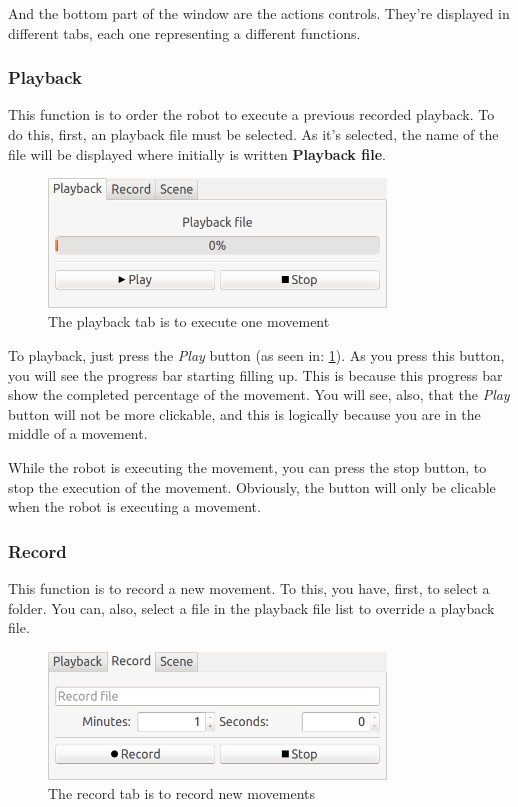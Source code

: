 \documentclass[oneside,a4paper,titlepage]{article}
\begin{document}
And the bottom part of the window are the actions controls. They're displayed in different tabs, each one representing a different functions.

\subsubsection{Playback}
\label{subsec:playback}
	This function is to order the robot to execute a previous recorded playback. To do this, first, an playback file must be selected. As it's selected, the name of the file will be displayed where initially is written \textbf{Playback file}.
	
	\begin{figure}[ht!]
		\centering
		\includegraphics[width=0.8\textwidth]{playback_tab}
		\caption[Playback Tab]{The playback tab is to execute one movement}
		\label{fig:playback_tab}
	\end{figure}
	
	To playback, just press the \emph{Play} button (as seen in: \ref{fig:playback_tab}). As you press this button, you will see the progress bar starting filling up. This is because this progress bar show the completed percentage of the movement. You will see, also, that the \emph{Play} button will not be more clickable, and this is logically because you are in the middle of a movement.
	
	While the robot is executing the movement, you can press the stop button, to stop the execution of the movement. Obviously, the button will only be clicable when the robot is executing a movement.
	
\subsubsection{Record}
\label{subsec:record}
	This function is to record a new movement. To this, you have, first, to select a folder. You can, also, select a file in the playback file list to override a playback file.
	
	\begin{figure}[ht!]
		\centering
		\includegraphics[width=0.8\textwidth]{record_tab}
		\caption[Record Tab]{The record tab is to record new movements}
		\label{fig:record_tab}
	\end{figure}
	
\end{document}
